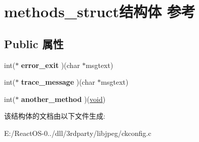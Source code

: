 \hypertarget{structmethods__struct}{}\section{methods\+\_\+struct结构体 参考}
\label{structmethods__struct}
\subsection*{Public 属性}
\begin{DoxyCompactItemize}
\item 
\mbox{\label{structmethods__struct_a8791e3c41209330aeeea9cdfd277854f}} 
int($\ast$ {\bfseries error\+\_\+exit} )(char $\ast$msgtext)
\item 
\mbox{\label{structmethods__struct_a703a7c7131e656173cae588a7254d24a}} 
int($\ast$ {\bfseries trace\+\_\+message} )(char $\ast$msgtext)
\item 
\mbox{\label{structmethods__struct_a46ca26dc913452458663c926ada90afc}} 
int($\ast$ {\bfseries another\+\_\+method} )(\hyperlink{interfacevoid}{void})
\end{DoxyCompactItemize}


该结构体的文档由以下文件生成\+:\begin{DoxyCompactItemize}
\item 
E\+:/\+React\+O\+S-\/0../dll/3rdparty/libjpeg/ckconfig.\+c\end{DoxyCompactItemize}
